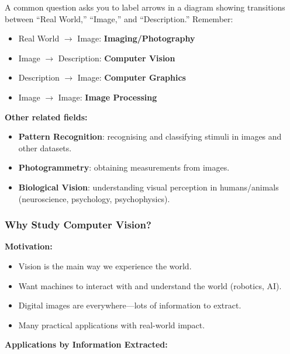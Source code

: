 \begin{tipbox}
A common question asks you to label arrows in a diagram showing transitions between ``Real World,'' ``Image,'' and ``Description.'' Remember:
\begin{itemize}
  \item Real World $\rightarrow$ Image: \textbf{Imaging/Photography}
  \item Image $\rightarrow$ Description: \textbf{Computer Vision}
  \item Description $\rightarrow$ Image: \textbf{Computer Graphics}
  \item Image $\rightarrow$ Image: \textbf{Image Processing}
\end{itemize}
\end{tipbox}

\textbf{Other related fields:}
\begin{itemize}
  \item \textbf{Pattern Recognition}: recognising and classifying stimuli in images and other datasets.
  \item \textbf{Photogrammetry}: obtaining measurements from images.
  \item \textbf{Biological Vision}: understanding visual perception in humans/animals (neuroscience, psychology, psychophysics).
\end{itemize}

\bigseparator

\subsubsection{Why Study Computer Vision?}

\textbf{Motivation:}
\begin{itemize}
  \item Vision is the main way we experience the world.
  \item Want machines to interact with and understand the world (robotics, AI).
  \item Digital images are everywhere---lots of information to extract.
  \item Many practical applications with real-world impact.
\end{itemize}

\separator

\textbf{Applications by Information Extracted:}

